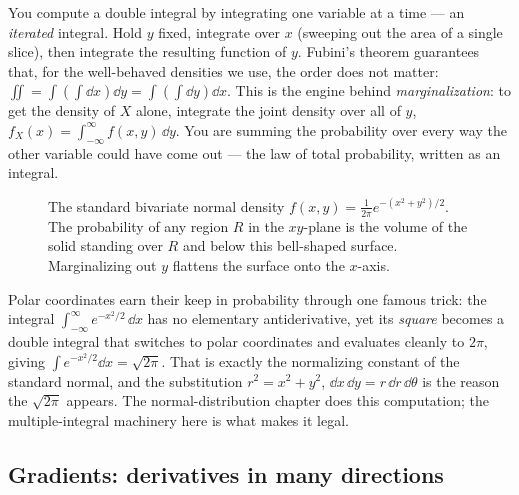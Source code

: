 You compute a double integral by integrating one variable at a time --- an \emph{iterated} integral.
Hold $y$ fixed, integrate over $x$ (sweeping out the area of a single slice), then integrate the
resulting function of $y$. Fubini's theorem guarantees that, for the well-behaved densities we use,
the order does not matter: $\iint = \int(\int \dd x)\dd y = \int(\int \dd y)\dd x$. This is the engine
behind \emph{marginalization}: to get the density of $X$ alone, integrate the joint density over all
of $y$, $f_X(x)=\int_{-\infty}^{\infty} f(x,y)\,\dd y$. You are summing the probability over every way
the other variable could have come out --- the law of total probability, written as an integral.

\begin{figure}[H]
\centering
{}
\caption{The standard bivariate normal density $f(x,y)=\frac{1}{2\pi}e^{-(x^2+y^2)/2}$. The
probability of any region $R$ in the $xy$-plane is the volume of the solid standing over $R$ and below
this bell-shaped surface. Marginalizing out $y$ flattens the surface onto the $x$-axis.}
\label{chAcla:fig-bivariate}
\end{figure}

\begin{connectionbox}
Polar coordinates earn their keep in probability through one famous trick: the integral
$\int_{-\infty}^{\infty} e^{-x^2/2}\,\dd x$ has no elementary antiderivative, yet its \emph{square}
becomes a double integral that switches to polar coordinates and evaluates cleanly to $2\pi$, giving
$\int e^{-x^2/2}\dd x = \sqrt{2\pi}$. That is exactly the normalizing constant of the standard normal,
and the substitution $r^2=x^2+y^2$, $\dd x\,\dd y = r\,\dd r\,\dd\theta$ is the reason the $\sqrt{2\pi}$
appears. The normal-distribution chapter does this computation; the multiple-integral machinery here
is what makes it legal.
\end{connectionbox}

\subsection{Gradients: derivatives in many directions}
\label{chAcla:gradient}

